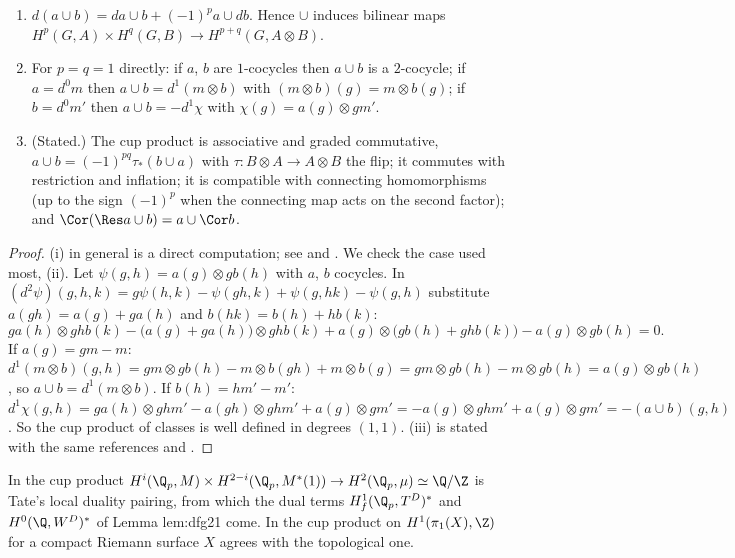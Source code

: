 \begin{proposition}\label{prop:cohomology:cup}
\begin{enumerate}[label=(\roman*)]
\item $d(a\cup b)=da\cup b+(-1)^pa\cup db$. Hence $\cup$ induces bilinear maps $H^p(G,A)\times H^q(G,B)\to H^{p+q}(G,A\otimes B)$.
\item For $p=q=1$ directly: if $a$, $b$ are $1$-cocycles then $a\cup b$ is a $2$-cocycle; if $a=d^0m$ then $a\cup b=d^1(m\otimes b)$ with $(m\otimes b)(g)=m\otimes b(g)$; if
$b=d^0m'$ then $a\cup b=-d^1\chi$ with $\chi(g)=a(g)\otimes gm'$.
\item (Stated.) The cup product is associative and graded commutative, $a\cup b=(-1)^{pq}\tau_*(b\cup a)$ with $\tau\colon B\otimes A\to A\otimes B$ the flip; it commutes with
restriction and inflation; it is compatible with connecting homomorphisms (up to the sign $(-1)^p$ when the connecting map acts on the second factor); and
$\Cor(\Res a\cup b)=a\cup\Cor b$.
\end{enumerate}
\end{proposition}

\begin{proof}
(i) in general is a direct computation; see \cite[Chapter I, Section 4]{NSW} and \cite[Chapter V, Section 3]{Brown}. We check the case used most, (ii).
Let $\psi(g,h)=a(g)\otimes gb(h)$ with $a$, $b$ cocycles. In $(d^2\psi)(g,h,k)=g\psi(h,k)-\psi(gh,k)+\psi(g,hk)-\psi(g,h)$ substitute $a(gh)=a(g)+ga(h)$ and $b(hk)=b(h)+hb(k)$:
\[
ga(h)\otimes ghb(k)-\bigl(a(g)+ga(h)\bigr)\otimes ghb(k)+a(g)\otimes\bigl(gb(h)+ghb(k)\bigr)-a(g)\otimes gb(h)=0 .
\]
If $a(g)=gm-m$: $d^1(m\otimes b)(g,h)=gm\otimes gb(h)-m\otimes b(gh)+m\otimes b(g)=gm\otimes gb(h)-m\otimes gb(h)=a(g)\otimes gb(h)$, so $a\cup b=d^1(m\otimes b)$. If $b(h)=hm'-m'$: $d^1\chi(g,h)=ga(h)\otimes ghm'-a(gh)\otimes ghm'+a(g)\otimes gm'=-a(g)\otimes ghm'+a(g)\otimes gm'=-(a\cup b)(g,h)$. So the cup product of
classes is well defined in degrees $(1,1)$. (iii) is stated with the same references and \cite[Chapter VIII, Section 3]{SerreLocalFields}.
\end{proof}

\begin{remark}\label{rem:cohomology:cup-uses}
In  the cup product $H^i(\Q_p,M)\times H^{2-i}(\Q_p,M^*(1))\to H^2(\Q_p,\mu)\simeq\Q/\Z$ is Tate's local duality pairing, from which the dual terms
$H^1_f(\Q_p,T^D)^*$ and $H^0(\Q,W^D)^*$ of Lemma lem:dfg21 come. In  the cup product on $H^1(\pi_1(X),\Z)$ for a compact Riemann surface $X$ agrees
with the topological one.
\end{remark}

